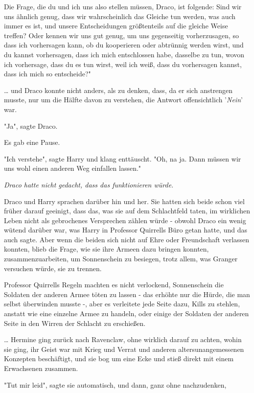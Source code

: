 {Die Frage, die du und ich uns also stellen müssen, Draco, ist folgende: Sind wir uns ähnlich genug, dass wir wahrscheinlich das Gleiche tun werden, was auch immer es ist, und unsere Entscheidungen größtenteils auf die gleiche Weise treffen? Oder kennen wir uns gut genug, um uns gegenseitig vorherzusagen, so dass ich vorhersagen kann, ob du kooperieren oder abtrünnig werden wirst, und du kannst vorhersagen, dass ich mich entschlossen habe, dasselbe zu tun, wovon ich vorhersage, dass du es tun wirst, weil ich weiß, dass du vorhersagen kannst, dass ich mich so entscheide?"

… und Draco konnte nicht anders, als zu denken, dass, da er sich anstrengen musste, nur um die Hälfte davon zu verstehen, die Antwort offensichtlich '\emph{Nein}' war.

"Ja", sagte Draco.

Es gab eine Pause.

"Ich verstehe", sagte Harry und klang enttäuscht. "Oh, na ja. Dann müssen wir uns wohl einen anderen Weg einfallen lassen."

\emph{Draco hatte nicht gedacht, dass das funktionieren würde.}

Draco und Harry sprachen darüber hin und her. Sie hatten sich beide schon viel früher darauf geeinigt, dass das, was sie auf dem Schlachtfeld taten, im wirklichen Leben nicht als gebrochenes Versprechen zählen würde - obwohl Draco ein wenig wütend darüber war, was Harry in Professor Quirrells Büro getan hatte, und das auch sagte. Aber wenn die beiden sich nicht auf Ehre oder Freundschaft verlassen konnten, blieb die Frage, wie sie ihre Armeen dazu bringen konnten, zusammenzuarbeiten, um Sonnenschein zu besiegen, trotz allem, was Granger versuchen würde, sie zu trennen.

Professor Quirrells Regeln machten es nicht verlockend, Sonnenschein die Soldaten der anderen Armee töten zu lassen - das erhöhte nur die Hürde, die man selbst überwinden musste -, aber es verleitete jede Seite dazu, Kills zu stehlen, anstatt wie eine einzelne Armee zu handeln, oder einige der Soldaten der anderen Seite in den Wirren der Schlacht zu erschießen.

… Hermine ging zurück nach Ravenclaw, ohne wirklich darauf zu achten, wohin sie ging, ihr Geist war mit Krieg und Verrat und anderen altersunangemessenen Konzepten beschäftigt, und sie bog um eine Ecke und stieß direkt mit einem Erwachsenen zusammen.

"Tut mir leid", sagte sie automatisch, und dann, ganz ohne nachzudenken,

}
